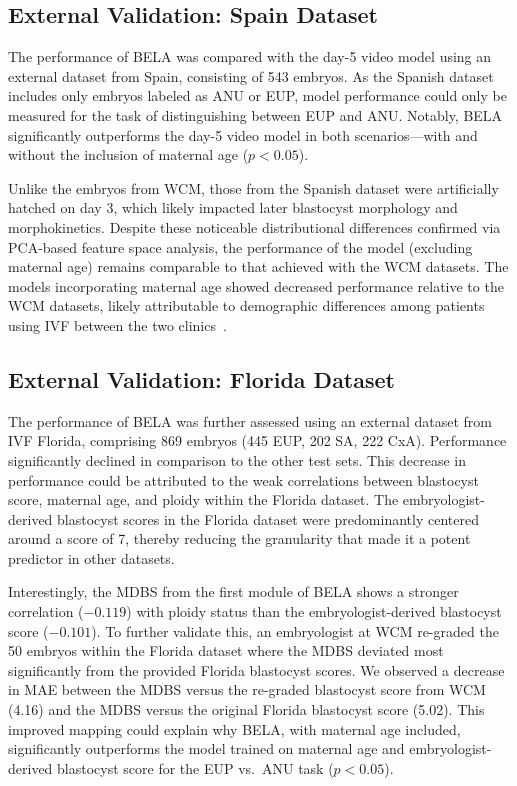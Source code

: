 \documentclass[12pt]{article}
\begin{document}
\subsection{External Validation: Spain Dataset}

The performance of BELA was compared with the day-5 video model using an external dataset from Spain, consisting of 543 embryos. As the Spanish dataset includes only embryos labeled as ANU or EUP, model performance could only be measured for the task of distinguishing between EUP and ANU. Notably, BELA significantly outperforms the day-5 video model in both scenarios---with and without the inclusion of maternal age ($p < 0.05$).

Unlike the embryos from WCM, those from the Spanish dataset were artificially hatched on day 3, which likely impacted later blastocyst morphology and morphokinetics. Despite these noticeable distributional differences confirmed via PCA-based feature space analysis, the performance of the model (excluding maternal age) remains comparable to that achieved with the WCM datasets. The models incorporating maternal age showed decreased performance relative to the WCM datasets, likely attributable to demographic differences among patients using IVF between the two clinics~\citep{druskin2014ivfspain, hodes2019ivfcost}.

\subsection{External Validation: Florida Dataset}

The performance of BELA was further assessed using an external dataset from IVF Florida, comprising 869 embryos (445 EUP, 202 SA, 222 CxA). Performance significantly declined in comparison to the other test sets. This decrease in performance could be attributed to the weak correlations between blastocyst score, maternal age, and ploidy within the Florida dataset. The embryologist-derived blastocyst scores in the Florida dataset were predominantly centered around a score of 7, thereby reducing the granularity that made it a potent predictor in other datasets.

Interestingly, the MDBS from the first module of BELA shows a stronger correlation ($-0.119$) with ploidy status than the embryologist-derived blastocyst score ($-0.101$). To further validate this, an embryologist at WCM re-graded the 50 embryos within the Florida dataset where the MDBS deviated most significantly from the provided Florida blastocyst scores. We observed a decrease in MAE between the MDBS versus the re-graded blastocyst score from WCM (4.16) and the MDBS versus the original Florida blastocyst score (5.02). This improved mapping could explain why BELA, with maternal age included, significantly outperforms the model trained on maternal age and embryologist-derived blastocyst score for the EUP vs.\ ANU task ($p < 0.05$).
\end{document}
